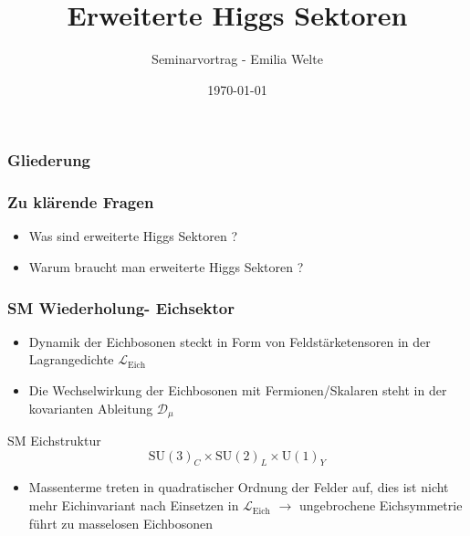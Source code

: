 \documentclass{beamer}
\title{Erweiterte Higgs Sektoren}
\author{Seminarvortrag - Emilia Welte}
\date{ \today}
\begin{document}
\begin{frame} 
\titlepage
\end{frame}


\begin{frame}
\frametitle{Gliederung}
\tableofcontents
\end{frame}

\begin{frame}
\frametitle{Zu klärende Fragen}
\begin{itemize}
\item Was sind erweiterte Higgs Sektoren ?
\item Warum braucht man erweiterte Higgs Sektoren ?
\end{itemize}
\end{frame}

\begin{frame}

\frametitle{SM Wiederholung- Eichsektor}
\begin{itemize}
\item Dynamik der Eichbosonen steckt in Form von Feldstärketensoren in der Lagrangedichte $\mathscr{L}_{\text{Eich}}$
\item Die Wechselwirkung der Eichbosonen mit Fermionen/Skalaren steht in der kovarianten Ableitung $\mathscr{D}_{\mu}$
\end{itemize}

\begin{block}{SM Eichstruktur}
\begin{equation}
\text{SU}(3)_{C}\times \text{SU}(2)_{L} \times \text{U}(1)_{Y} 
\end{equation}
\end{block}

\begin{itemize}
\item Massenterme treten in quadratischer Ordnung der Felder auf, dies ist nicht mehr Eichinvariant nach Einsetzen in $\mathscr{L}_{\text{Eich}}$ $\rightarrow$ ungebrochene Eichsymmetrie führt zu masselosen Eichbosonen
\end{itemize}

\end{frame}
\end{document}
